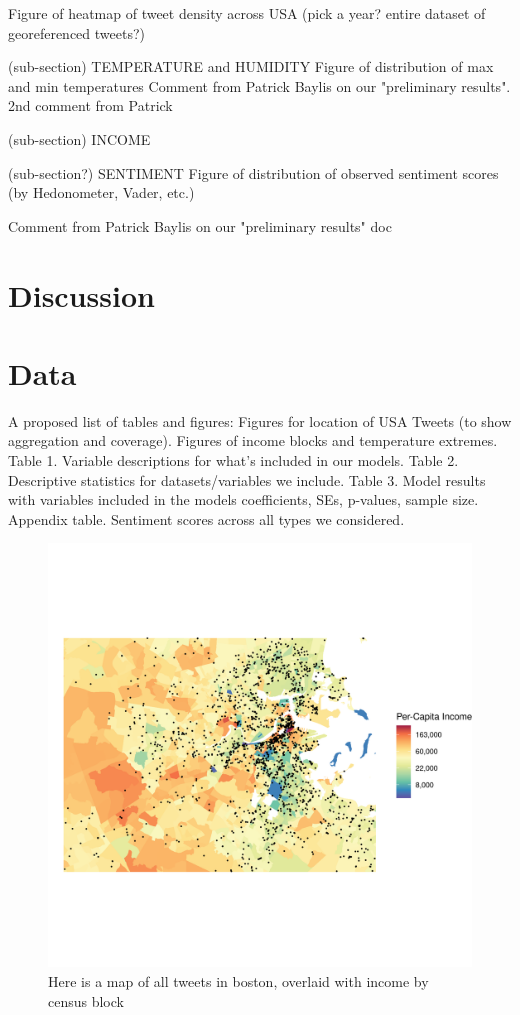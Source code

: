 \documentclass{article}
\begin{document}
Figure of heatmap of tweet density across USA (pick a year? entire dataset of georeferenced tweets?)

(sub-section) TEMPERATURE and HUMIDITY
Figure of distribution of max and min temperatures
Comment from Patrick Baylis on our "preliminary results". 2nd comment from Patrick

(sub-section) INCOME

(sub-section?) SENTIMENT
Figure of distribution of observed sentiment scores (by Hedonometer, Vader, etc.)

Comment from Patrick Baylis on our "preliminary results" doc


\section{Discussion}

\section{Data}
A proposed list of tables and figures:
Figures for location of USA Tweets (to show aggregation and coverage).
Figures of income blocks and temperature extremes.
Table 1. Variable descriptions for what's included in our models.
Table 2. Descriptive statistics for datasets/variables we include.
Table 3. Model results with variables included in the models coefficients, SEs, p-values, sample size.
Appendix table. Sentiment scores across all types we considered.
\begin{figure}[H]
  \centering
  \includegraphics[width=\linewidth]{../res/Boston_Map.png}
  \caption{Here is a map of all tweets in boston, overlaid with income by census block}
  \label{fig:timeseries}
\end{figure}
\end{document}
